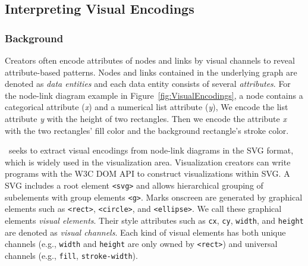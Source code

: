 \subsection{Interpreting Visual Encodings}\label{sec:visualencodings}
\subsubsection{Background}
Creators often encode attributes of nodes and links by visual channels to reveal attribute-based patterns.
Nodes and links contained in the underlying graph are denoted as \textit{data entities} and each data entity consists of several \textit{attributes}.
For the node-link diagram example in Figure~\ref{fig:VisualEncodings}, a node contains a categorical attribute (\textit{x}) and a numerical list attribute (\textit{y}), We encode the list attribute \textit{y} with the height of two rectangles.
Then we encode the attribute \textit{x} with the two rectangles' fill color and the background rectangle's stroke color.

\ApproachName~seeks to extract visual encodings from node-link diagrams in the SVG format, which is widely used in the visualization area.
Visualization creators can write programs with the W3C DOM API to construct visualizations within SVG.
A SVG includes a root element \texttt{<svg>} and allows hierarchical grouping of subelements with group elements \texttt{<g>}.
Marks onscreen are generated by graphical elements such as \texttt{<rect>}, \texttt{<circle>}, and \texttt{<ellipse>}.
We call these graphical elements \textit{visual elements}.
Their style attributes such as \texttt{cx}, \texttt{cy}, \texttt{width}, and \texttt{height} are denoted as \textit{visual channels}.
Each kind of visual elements has both unique channels (e.g., \texttt{width} and \texttt{height} are only owned by \texttt{<rect>}) and universal channels (e.g., \texttt{fill}, \texttt{stroke-width}).

